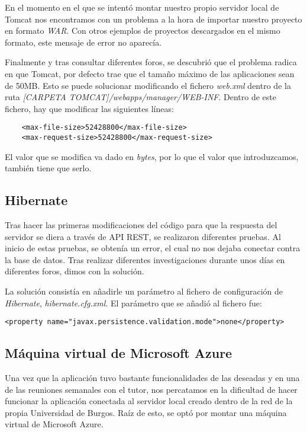 En el momento en el que se intentó montar nuestro propio servidor local de Tomcat nos encontramos con un problema a la hora de importar nuestro proyecto en formato \textit{WAR}. Con otros ejemplos de proyectos descargados en el mismo formato, este mensaje de error no aparecía.

Finalmente y tras consultar diferentes foros, se descubrió que el problema radica en que Tomcat, por defecto trae que el tamaño máximo de las aplicaciones sean de 50MB. Esto se puede solucionar modificando el fichero \textit{web.xml} dentro de la ruta \textit{[CARPETA TOMCAT]/webapps/manager/WEB-INF}. Dentro de este fichero, hay que modificar las siguientes líneas:


\begin{lstlisting}
	<max-file-size>52428800</max-file-size>
	<max-request-size>52428800</max-request-size>
\end{lstlisting}

El valor que se modifica va dado en \textit{bytes}, por lo que el valor que introduzcamos, también tiene que serlo.

\subsection{Hibernate}

Tras hacer las primeras modificaciones del código para que la respuesta del servidor se diera a través de API REST, se realizaron diferentes pruebas. Al inicio de estas pruebas, se obtenía un error, el cual no nos dejaba conectar contra la base de datos. Tras realizar diferentes investigaciones durante unos días en diferentes foros, dimos con la solución.

La solución consistía en añadirle un parámetro al fichero de configuración de \textit{Hibernate}, \textit{hibernate.cfg.xml}. El parámetro que se añadió al fichero fue:

\begin{lstlisting}
<property name="javax.persistence.validation.mode">none</property>
\end{lstlisting}

\subsection{Máquina virtual de Microsoft Azure}\label{azure}

Una vez que la aplicación tuvo bastante funcionalidades de las deseadas y en una de las reuniones semanales con el tutor, nos percatamos en la dificultad de hacer funcionar la aplicación conectada al servidor local creado dentro de la red de la propia Universidad de Burgos. Raíz de esto, se optó por montar una máquina virtual de Microsoft Azure.

